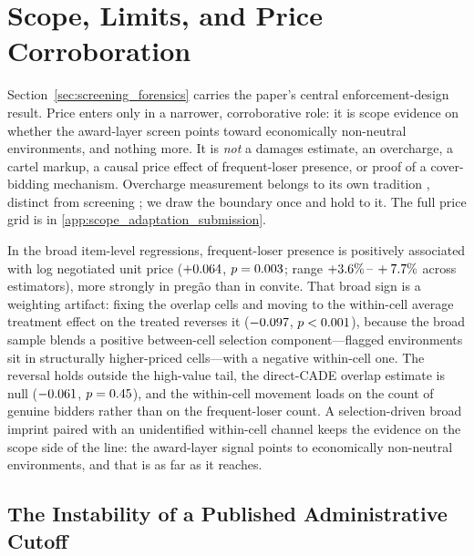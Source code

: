 \section{Scope, Limits, and Price Corroboration}
\label{sec:price_scope_conclusion}

Section~\ref{sec:screening_forensics} carries the paper's central
enforcement-design result. Price enters only in a narrower,
corroborative role: it is scope evidence on whether the award-layer
screen points toward economically non-neutral environments, and nothing
more. It is \emph{not} a damages estimate, an overcharge, a cartel
markup, a causal price effect of frequent-loser presence, or proof of a
cover-bidding mechanism. Overcharge measurement belongs to its own
tradition \citep{bryant1991price,connor2007price}, distinct from
screening \citep{marshall2012economics,harrington2008detecting}; we
draw the boundary once and hold to it. The full price grid is in
\ref{app:scope_adaptation_submission}.

In the broad item-level regressions, frequent-loser presence is
positively associated with log negotiated unit price ($+0.064$,
$p=0.003$; range $+3.6\%\,\text{--}\,+7.7\%$ across estimators), more
strongly in pregão than in convite. That broad sign is a weighting
artifact: fixing the overlap cells and moving to the within-cell
average treatment effect on the treated reverses it
($-0.097$, $p<0.001$), because the broad
sample blends a positive between-cell selection component---flagged
environments sit in structurally higher-priced cells---with a negative
within-cell one. The reversal holds outside the high-value tail, the
direct-CADE overlap estimate is null ($-0.061$,
$p=0.45$), and the within-cell movement loads on the
count of genuine bidders rather than on the frequent-loser count. A
selection-driven broad imprint paired with an unidentified within-cell
channel keeps the evidence on the scope side of the line: the
award-layer signal points to economically non-neutral environments, and
that is as far as it reaches.

\subsection{The Instability of a Published Administrative Cutoff}
\label{sec:adaptive_deployment_submission}

